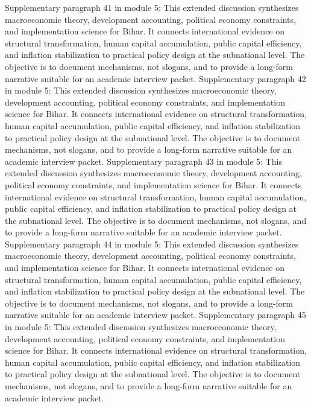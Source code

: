 \documentclass[preprint,12pt]{elsarticle}
\begin{document}
Supplementary paragraph 41 in module 5: This extended discussion synthesizes macroeconomic theory, development accounting, political economy constraints, and implementation science for Bihar. It connects international evidence on structural transformation, human capital accumulation, public capital efficiency, and inflation stabilization to practical policy design at the subnational level. The objective is to document mechanisms, not slogans, and to provide a long-form narrative suitable for an academic interview packet.
Supplementary paragraph 42 in module 5: This extended discussion synthesizes macroeconomic theory, development accounting, political economy constraints, and implementation science for Bihar. It connects international evidence on structural transformation, human capital accumulation, public capital efficiency, and inflation stabilization to practical policy design at the subnational level. The objective is to document mechanisms, not slogans, and to provide a long-form narrative suitable for an academic interview packet.
Supplementary paragraph 43 in module 5: This extended discussion synthesizes macroeconomic theory, development accounting, political economy constraints, and implementation science for Bihar. It connects international evidence on structural transformation, human capital accumulation, public capital efficiency, and inflation stabilization to practical policy design at the subnational level. The objective is to document mechanisms, not slogans, and to provide a long-form narrative suitable for an academic interview packet.
Supplementary paragraph 44 in module 5: This extended discussion synthesizes macroeconomic theory, development accounting, political economy constraints, and implementation science for Bihar. It connects international evidence on structural transformation, human capital accumulation, public capital efficiency, and inflation stabilization to practical policy design at the subnational level. The objective is to document mechanisms, not slogans, and to provide a long-form narrative suitable for an academic interview packet.
Supplementary paragraph 45 in module 5: This extended discussion synthesizes macroeconomic theory, development accounting, political economy constraints, and implementation science for Bihar. It connects international evidence on structural transformation, human capital accumulation, public capital efficiency, and inflation stabilization to practical policy design at the subnational level. The objective is to document mechanisms, not slogans, and to provide a long-form narrative suitable for an academic interview packet.
\end{document}
